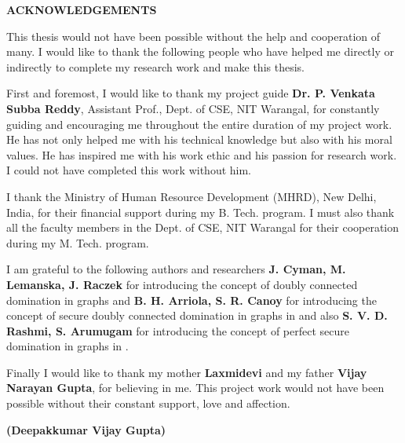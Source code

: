 \bigskip  \bigskip \bigskip \bigskip \bigskip \bigskip
\hfill  \hfill \hfill
\Large
\begin{center}
\textbf{ACKNOWLEDGEMENTS}
\end{center}
\bigskip  
\small
This thesis would not have been possible without the help and cooperation of many. I would like to thank the following people who have helped me directly or indirectly to complete my research work and make this thesis. \par \noindent
First and foremost, I would like to thank my project guide \textbf {Dr. P. Venkata Subba Reddy}, Assistant Prof., Dept. of CSE, NIT Warangal, for constantly guiding and encouraging me throughout the entire duration of my project work. He has not only helped me with his technical knowledge but also with his moral values. He has inspired me with his work ethic and his passion for research work. I could not have completed this work without him.   
\par \noindent
I thank the Ministry of Human Resource Development (MHRD), New Delhi, India, for their financial support during my B. Tech. program. I must also thank all the faculty members in the Dept. of CSE, NIT Warangal for their cooperation during my M. Tech. program.
\par \noindent
I am grateful to the following authors and researchers \textbf{J. Cyman, M. Lemanska, J. Raczek} for introducing the concept of doubly connected domination in graphs \cite{dcds} and \textbf{B. H. Arriola, S. R. Canoy} for introducing the concept of secure doubly connected domination in graphs in \cite{sdcds} and also \textbf{S. V. D. Rashmi, S. Arumugam} for introducing the concept of perfect secure domination in graphs in \cite{pscd}.
\par \noindent
Finally I would like to thank my mother \textbf{Laxmidevi} and my father \textbf{Vijay Narayan Gupta}, for believing in me. This project work would not have been possible without their constant support, love and affection.
\vspace{0.25in}
\begin{flushright}
\textbf{(Deepakkumar Vijay Gupta)}
\end{flushright}
\newpage 
